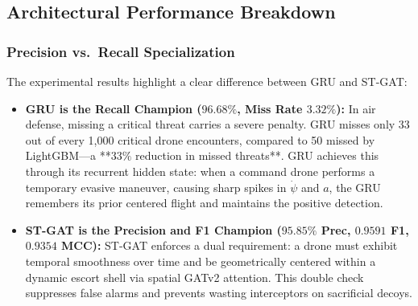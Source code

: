 \documentclass[9pt]{ieeeconf}
\begin{document}
\begin{table}[t]
\centering
\caption{Master Cross-Model Benchmark Comparison on Held-Out Test Scenarios (305,016 Total Frames)}
\label{tab:master_benchmark}
\scriptsize
{}
\end{table}

\subsection{Architectural Performance Breakdown}

\subsubsection{Precision vs.\ Recall Specialization}
The experimental results highlight a clear difference between GRU and ST-GAT:
\begin{itemize}
    \item \textbf{GRU is the Recall Champion ($96.68\%$, Miss Rate $3.32\%$):} In air defense, missing a critical threat carries a severe penalty. GRU misses only 33 out of every 1,000 critical drone encounters, compared to 50 missed by LightGBM—a **$33\%$ reduction in missed threats**. GRU achieves this through its recurrent hidden state: when a command drone performs a temporary evasive maneuver, causing sharp spikes in $\dot{\psi}$ and $a$, the GRU remembers its prior centered flight and maintains the positive detection.
    \item \textbf{ST-GAT is the Precision and F1 Champion ($95.85\%$ Prec, $0.9591$ F1, $0.9354$ MCC):} ST-GAT enforces a dual requirement: a drone must exhibit temporal smoothness over time and be geometrically centered within a dynamic escort shell via spatial GATv2 attention. This double check suppresses false alarms and prevents wasting interceptors on sacrificial decoys.
\end{itemize}
\end{document}
